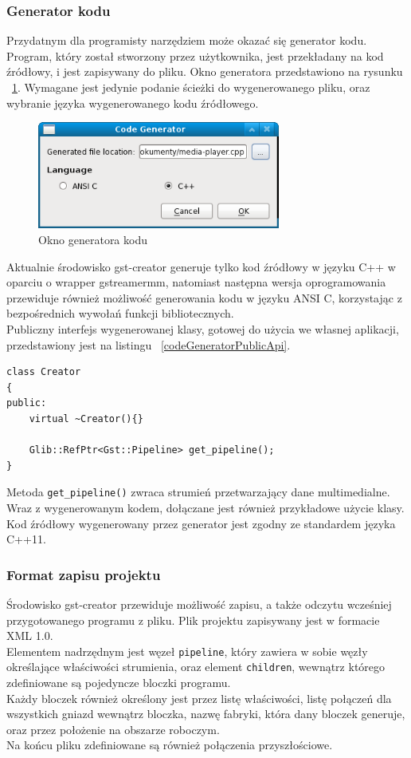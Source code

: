 \documentclass[12pt]{article}
\begin{document}
\subsubsection{Generator kodu}
Przydatnym dla programisty narzędziem może okazać się generator kodu. Program, który został stworzony przez użytkownika, jest przekładany na kod źródłowy, i jest zapisywany do pliku. Okno generatora przedstawiono na rysunku ~\ref{fig:codeGenerator}. Wymagane jest jedynie podanie ścieżki do wygenerowanego pliku, oraz wybranie języka wygenerowanego kodu źródłowego.
\begin{figure}[H]
  \includegraphics[width=80mm]{img/code-generator.png}
  \caption{Okno generatora kodu}
  \label{fig:codeGenerator}
\end{figure}
Aktualnie środowisko gst-creator generuje tylko kod źródłowy w języku C++ w oparciu o wrapper gstreamermm, natomiast następna wersja oprogramowania przewiduje również możliwość generowania kodu w języku ANSI C, korzystając z bezpośrednich wywołań funkcji bibliotecznych.\\
Publiczny interfejs wygenerowanej klasy, gotowej do użycia we własnej aplikacji, przedstawiony jest na listingu ~\ref{codeGeneratorPublicApi}.
\begin{lstlisting}[caption=Publiczny interfejs klasy stworzonej przez generator kodu, label=codeGeneratorPublicApi]
class Creator
{
public:
	virtual ~Creator(){}

	Glib::RefPtr<Gst::Pipeline> get_pipeline();
}
\end{lstlisting}
Metoda \texttt{get\_pipeline()} zwraca strumień przetwarzający dane multimedialne.\\
Wraz z wygenerowanym kodem, dołączane jest również przykładowe użycie klasy.\\
Kod źródłowy wygenerowany przez generator jest zgodny ze standardem języka C++11.
\subsubsection{Format zapisu projektu}
Środowisko gst-creator przewiduje możliwość zapisu, a także odczytu wcześniej przygotowanego programu z pliku. Plik projektu zapisywany jest w formacie XML 1.0.\\
Elementem nadrzędnym jest węzeł \texttt{pipeline}, który zawiera w sobie węzły określające właściwości strumienia, oraz element \texttt{children}, wewnątrz którego zdefiniowane są pojedyncze bloczki programu. \\
Każdy bloczek również określony jest przez listę właściwości, listę połączeń dla wszystkich gniazd wewnątrz bloczka, nazwę fabryki, która dany bloczek generuje, oraz przez położenie na obszarze roboczym. \\
Na końcu pliku zdefiniowane są również połączenia przyszłościowe.
\cleardoublepage
\end{document}
